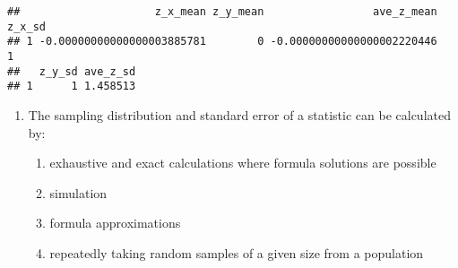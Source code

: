 \documentclass[]{article}
\newenvironment{Shaded}{\begin{snugshade}}{\end{snugshade}}
\newcommand{\KeywordTok}[1]{\textcolor[rgb]{0.13,0.29,0.53}{\textbf{#1}}}
\newcommand{\DataTypeTok}[1]{\textcolor[rgb]{0.13,0.29,0.53}{#1}}
\newcommand{\DecValTok}[1]{\textcolor[rgb]{0.00,0.00,0.81}{#1}}
\newcommand{\StringTok}[1]{\textcolor[rgb]{0.31,0.60,0.02}{#1}}
\newcommand{\OperatorTok}[1]{\textcolor[rgb]{0.81,0.36,0.00}{\textbf{#1}}}
\newcommand{\NormalTok}[1]{#1}
\providecommand{\tightlist}{%
  \setlength{\itemsep}{0pt}\setlength{\parskip}{0pt}}
\begin{document}
\begin{Shaded}
\end{Shaded}

\begin{verbatim}
##                     z_x_mean z_y_mean                 ave_z_mean z_x_sd
## 1 -0.00000000000000003885781        0 -0.00000000000000002220446      1
##   z_y_sd ave_z_sd
## 1      1 1.458513
\end{verbatim}

\begin{enumerate}
\def\labelenumi{\arabic{enumi}.}
\setcounter{enumi}{18}
\item
  The sampling distribution and standard error of a statistic can be
  calculated by:

  \begin{enumerate}
  \def\labelenumii{\alph{enumii}.}
  \tightlist
  \item
    exhaustive and exact calculations where formula solutions are
    possible
  \item
    simulation
  \item
    formula approximations
  \item
    repeatedly taking random samples of a given size from a population
  \end{enumerate}
\end{enumerate}
\end{document}
